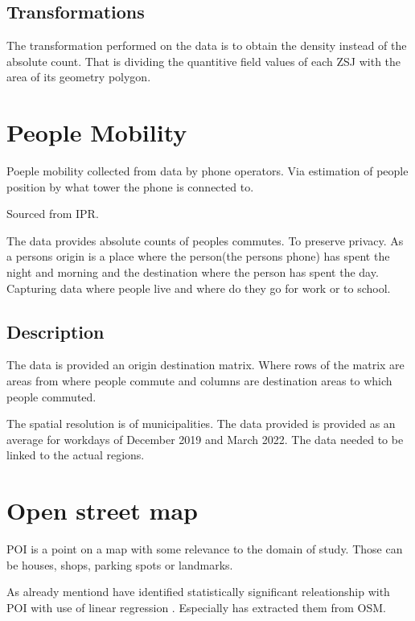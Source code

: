 \subsection{Transformations}

The transformation performed on the data is to obtain the density instead of the absolute count. That is dividing the quantitive field values of each ZSJ with the area of its geometry polygon.

\section{People Mobility}

Poeple mobility collected from data by phone operators. Via estimation of people position by what tower the phone is connected to.

Sourced from IPR.

The data provides absolute counts of peoples commutes. To preserve privacy. As a persons origin is a place where the person(the persons phone) has spent the night and morning and the destination where the person has spent the day. Capturing data where people live and where do they go for work or to school.

\subsection{Description}

The data is provided an origin destination matrix. Where rows of the matrix are areas from where people commute and  columns are destination areas to which people commuted.

The spatial resolution is of municipalities. The data provided is provided as an average for workdays of December 2019 and March 2022. The data needed to be linked to the actual regions.



\section{Open street map}

\acrfull{POI} is a point on a map with some relevance to the domain of study. Those can be houses, shops, parking spots or landmarks.

As already mentiond  have identified statistically significant releationship with \acrshort{POI} with use of linear regression . Especially \cite{hechtGlobalElectricVehicle2024} has extracted them from \acrfull{OSM}.


